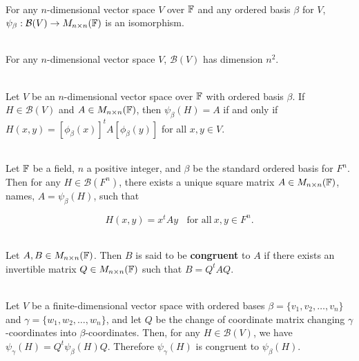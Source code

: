 \begin{theorem}
	\hfill\\
	For any $n$-dimensional vector space $V$ over $\mathbb{F}$ and any ordered basis $\beta$ for $V$, $\psi_\beta : \mathcal{B}(V) \to M_{n \times n}(\mathbb{F})$ is an isomorphism.
\end{theorem}

\begin{corollary}
	\hfill\\
	For any $n$-dimensional vector space $V$, $\mathcal{B}(V)$ has dimension $n^2$.
\end{corollary}

\begin{corollary}
	\hfill\\
	Let $V$ be an $n$-dimensional vector space over $\mathbb{F}$ with ordered basis $\beta$. If $H \in \mathcal{B}(V)$ and $A \in M_{n \times n}(\mathbb{F})$, then $\psi_\beta(H) = A$ if and only if $H(x,y) = [\phi_\beta(x)]^tA[\phi_\beta(y)]$ for all $x,y \in V$.
\end{corollary}

\begin{corollary}
	\hfill\\
	Let $\mathbb{F}$ be a field, $n$ a positive integer, and $\beta$ be the standard ordered basis for $F^n$. Then for any $H \in \mathcal{B}(F^n)$, there exists a unique square matrix $A \in M_{n \times n}(\mathbb{F})$, names, $A = \psi_\beta(H)$, such that

	\[H(x,y) = x^tAy\ \ \ \ \text{for all}\ x,y \in F^n.\]
\end{corollary}

\begin{definition}
	\hfill\\
	Let $A,B \in M_{n \times n}(\mathbb{F})$. Then $B$ is said to be \textbf{congruent} to $A$ if there exists an invertible matrix $Q \in M_{n \times n}(\mathbb{F})$ such that $B = Q^tAQ$.
\end{definition}

\begin{theorem}
	\hfill\\
	Let $V$ be a finite-dimensional vector space with ordered bases $\beta = \{v_1, v_2, \dots, v_n\}$ and $\gamma = \{w_1, w_2, \dots, w_n\}$, and let $Q$ be the change of coordinate matrix changing $\gamma$-coordinates into $\beta$-coordinates. Then, for any $H \in \mathcal{B}(V)$, we have $\psi_\gamma(H) = Q^t\psi_\beta(H)Q$. Therefore $\psi_\gamma(H)$ is congruent to $\psi_\beta(H)$.
\end{theorem}

